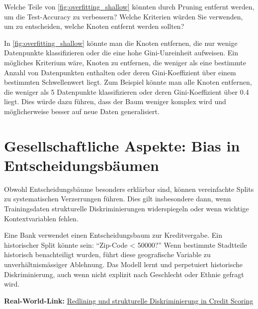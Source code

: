 \begin{myexercise}
    Welche Teile von \cref{fig:overfitting_shallow} könnten durch Pruning entfernt werden, um die Test-Accuracy zu verbessern? Welche Kriterien würden Sie verwenden, um zu entscheiden, welche Knoten entfernt werden sollten?
    \begin{myanswer}
        In \cref{fig:overfitting_shallow} könnte man die Knoten entfernen, die nur wenige Datenpunkte klassifizieren oder die eine hohe Gini-Unreinheit aufweisen. Ein mögliches Kriterium wäre, Knoten zu entfernen, die weniger als eine bestimmte Anzahl von Datenpunkten enthalten oder deren Gini-Koeffizient über einem bestimmten Schwellenwert liegt.
        Zum Beispiel könnte man alle Knoten entfernen, die weniger als 5 Datenpunkte klassifizieren oder deren Gini-Koeffizient über 0.4 liegt. Dies würde dazu führen, dass der Baum weniger komplex wird und möglicherweise besser auf neue Daten generalisiert.
    \end{myanswer}
\end{myexercise}

\section{Gesellschaftliche Aspekte: Bias in Entscheidungsbäumen}

\begin{mydefinition}
    Obwohl Entscheidungsbäume besonders erklärbar sind, können vereinfachte Splits zu systematischen Verzerrungen führen. Dies gilt insbesondere dann, wenn Trainingsdaten strukturelle Diskriminierungen widerspiegeln oder wenn wichtige Kontextvariablen fehlen.
\end{mydefinition}

\begin{myexample}
    Eine Bank verwendet einen Entscheidungsbaum zur Kreditvergabe. Ein historischer Split könnte sein: \enquote{Zip-Code < 50000?} Wenn bestimmte Stadtteile historisch benachteiligt wurden, führt diese geografische Variable zu unverhältnismässiger Ablehnung. Das Modell lernt und perpetuiert historische Diskriminierung, auch wenn nicht explizit nach Geschlecht oder Ethnie gefragt wird.

    \textbf{Real-World-Link:} \href{https://en.wikipedia.org/wiki/Redlining}{Redlining und strukturelle Diskriminierung in Credit Scoring}
\end{myexample}

